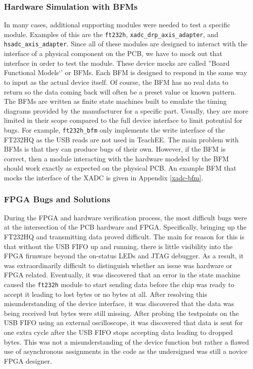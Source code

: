\documentclass[letterpaper,11pt]{article}
\newcommand{\code}[1]{\texttt{#1}}
\begin{document}
\subsubsection{Hardware Simulation with BFMs}
In many cases, additional supporting modules were needed to test a specific
module. Examples of this are the \code{ft232h}, \code{xadc_drp_axis_adapter},
and \code{hsadc_axis_adapter}. Since all of these modules are designed to
interact with the interface of a physical component on the PCB, we have to mock
out that interface in order to test the module. These device mocks are called
''Board Functional Models`' or BFMs. Each BFM is designed to respond in the same
way to input as the actual device itself. Of course, the BFM has no real data to
return so the data coming back will often be a preset value or known pattern.
The BFMs are written as finite state machines built to emulate the timing
diagrams provided by the manufacturer for a specific part. Usually, they are
more limited in their scope compared to the full device interface to limit
potential for bugs. For example, \code{ft232h_bfm} only implements the write
interface of the FT232HQ as the USB reads are not used in TeachEE. The main
problem with BFMs is that they can produce bugs of their own. However, if the
BFM is correct, then a module interacting with the hardware modeled by the BFM
should work exactly as expected on the physical PCB. An example BFM that mocks
the interface of the XADC is given in Appendix \ref{xadc-bfm}.

\subsubsection{FPGA Bugs and Solutions} \label{sec:fpga-bugs}
During the FPGA and hardware verification process, the most difficult bugs were
at the intersection of the PCB hardware and FPGA. Specifically, bringing up the
FT232HQ and transmitting data proved difficult. The main for reason for this is
that without the USB FIFO up and running, there is little visibility into the
FPGA firmware beyond the on-status LEDs and JTAG debugger. As a result, it was
extraordinarily difficult to distinguish whether an issue was hardware or FPGA
related. Eventually, it was discovered that an error in the state machine caused
the \code{ft232h} module to start sending data before the chip was ready to
accept it leading to lost bytes or no bytes at all. After resolving this
misunderstanding of the device interface, it was discovered that the data was
being received but bytes were still missing. After probing the testpoints on the
USB FIFO using an external oscilloscope, it was discovered that data is sent for
one extra cycle after the USB FIFO stops accepting data leading to dropped
bytes. This was not a misunderstanding of the device function but rather a
flawed use of asynchronous assignments in the code as the undersigned was still
a novice FPGA designer.
\end{document}
